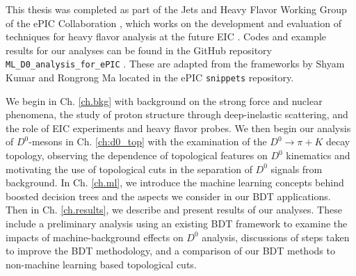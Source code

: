 This thesis was completed as part of the Jets and Heavy Flavor Working Group of the ePIC Collaboration \cite{ePIC}, which works on the development and evaluation of techniques for heavy flavor analysis at the future EIC \cite{EIC}. Codes and example results for our analyses can be found in the GitHub repository \texttt{ML\_D0\_analysis\_for\_ePIC} \cite{github}. These are adapted from the frameworks by Shyam Kumar \cite{Shyam_analysis,Shyam_ml} and Rongrong Ma \cite{Rongrong_jobs} located in the ePIC \texttt{snippets} repository.

We begin in Ch. \ref{ch.bkg} with background on the strong force and nuclear phenomena, the study of proton structure through deep-inelastic scattering, and the role of EIC experiments and heavy flavor probes. We then begin our analysis of $D^0$-mesons in Ch. \ref{ch:d0_top} with the examination of the $D^0\rightarrow\pi+K$ decay topology, observing the dependence of topological features on $D^0$ kinematics and motivating the use of topological cuts in the separation of $D^0$ signals from background. In Ch. \ref{ch.ml}, we introduce the machine learning concepts behind boosted decision trees and the aspects we consider in our BDT applications. Then in Ch. \ref{ch.results}, we describe and present results of our analyses. These include a preliminary analysis using an existing BDT framework to examine the impacts of machine-background effects on $D^0$ analysis, discussions of steps taken to improve the BDT methodology, and a comparison of our BDT methods to non-machine learning based topological cuts. 